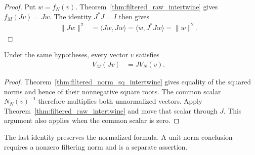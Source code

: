 \begin{proof}
  \leanok
  Put $w=f_N(v)$. Theorem~\ref{thm:filtered_raw_intertwine} gives
  $f_M(Jv)=Jw$. The identity $J^*J=I$ then gives
  \begin{align}
    \|Jw\|^2&=\langle Jw,Jw\rangle
       =\langle w,J^*Jw\rangle=\|w\|^2.
  \end{align}
\end{proof}

\begin{theorem}
  \label{thm:filtered_vector_intertwine}
  \leanok
  Under the same hypotheses, every vector $v$ satisfies
  \begin{align}
    V_M(Jv)&=JV_N(v).
  \end{align}
\end{theorem}

\begin{proof}
  \leanok
  Theorem~\ref{thm:filtered_norm_sq_intertwine} gives equality of the
  squared norms and hence of their nonnegative square roots.
  The common scalar $N_N(v)^{-1}$ therefore multiplies both unnormalized vectors.
  Apply Theorem~\ref{thm:filtered_raw_intertwine} and move that scalar
  through $J$. This argument also applies when the common scalar is zero.
\end{proof}

The last identity preserves the normalized formula. A unit-norm conclusion
requires a nonzero filtering norm and is a separate assertion.
